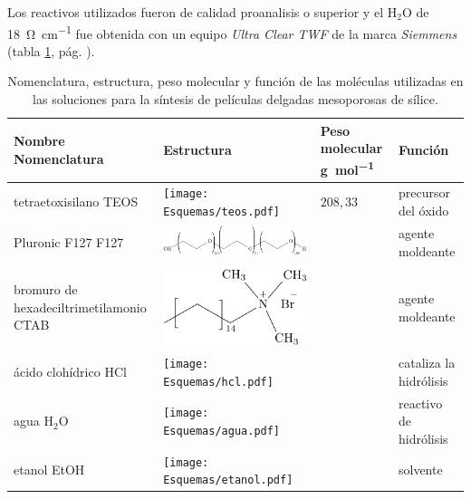 		Los reactivos utilizados fueron de calidad proanalisis o superior y el H$_2$O de \SI{18}{\ohm.\cm^{-1}} fue obtenida con un equipo \textit{Ultra Clear TWF} de la marca \textit{Siemmens} (tabla \ref{tabla:reactivos}, pág. \pageref{tabla:reactivos}). 
				\begin{table}[ht!] 
						  \caption[Reactivos para los soles]{Nomenclatura, estructura, peso molecular y función de las moléculas utilizadas en las soluciones para la síntesis de películas delgadas mesoporosas de sílice.} 
				  		  \begin{tabular}{>{\raggedright\arraybackslash}m{2.40cm}>{\centering\arraybackslash}m{4cm}>{\centering\arraybackslash}m{2.35cm}>{\raggedright\arraybackslash}m{1.7cm}} 
				  		  \toprule
						  Nombre Nomenclatura    & Estructura & Peso molecular \si{g.mol^{-1}} & Función\\ \midrule
				      	  tetraetoxisilano\index{tetraetoxisilano} TEOS & \texttt{[image: Esquemas/teos.pdf]} & $208,33$ & precursor\index{precursor} del óxido  \\ \midrule
				  		  Pluronic F127\index{Pluronic F127} F127    & \hspace*{-10px} \includegraphics[scale=0.5]{Esquemas/f127.pdf} & \multirow{1}{*}{$13800$}	 & agente moldeante\index{agente moldeante}	 \\ \midrule
				  		  bromuro de hexadeciltrimetilamonio\index{bromuro de hexadeciltrimetilamonio}  CTAB   & \hspace*{1cm} \includegraphics[scale=0.6]{Esquemas/ctab.pdf} & \multirow{1}{*}{$364.48$}	 & agente moldeante\index{agente moldeante}	 \\ \midrule
				  		  ácido\index{acido@ácido} clohídrico\index{acido@ácido!clohídrico} HCl\index{acido@ácido!clohídrico}& \texttt{[image: Esquemas/hcl.pdf]}  & \multirow{1}{*}{$36,46$}   & cataliza la hidrólisis\index{hidrólisis} \\ \midrule
				  		  agua \hspace{2cm} H$_2$O  &  \texttt{[image: Esquemas/agua.pdf]}  & \multirow{1}{*}{$18,02$}   & reactivo de hidrólisis\index{hidrólisis} \\ \midrule
				  		  etanol\index{etanol} \hspace{2cm} EtOH\index{etanol}  & \texttt{[image: Esquemas/etanol.pdf]}  & \multirow{1}{*}{$46,07$}   & solvente \\ 
				  		  \bottomrule
				    	  \end{tabular}
				   		  \label{tabla:reactivos}
				 \end{table}
		
